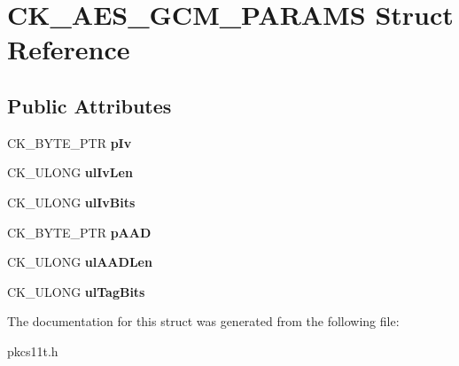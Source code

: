 \hypertarget{struct_c_k___a_e_s___g_c_m___p_a_r_a_m_s}{}\section{C\+K\+\_\+\+A\+E\+S\+\_\+\+G\+C\+M\+\_\+\+P\+A\+R\+A\+MS Struct Reference}
\label{struct_c_k___a_e_s___g_c_m___p_a_r_a_m_s}
\subsection*{Public Attributes}
\begin{DoxyCompactItemize}
\item 
\mbox{\label{struct_c_k___a_e_s___g_c_m___p_a_r_a_m_s_a04e13d2e13d24072950b952936a519a4}} 
C\+K\+\_\+\+B\+Y\+T\+E\+\_\+\+P\+TR {\bfseries p\+Iv}
\item 
\mbox{\label{struct_c_k___a_e_s___g_c_m___p_a_r_a_m_s_ab3637a7619e63914ac571b4736e020d9}} 
C\+K\+\_\+\+U\+L\+O\+NG {\bfseries ul\+Iv\+Len}
\item 
\mbox{\label{struct_c_k___a_e_s___g_c_m___p_a_r_a_m_s_a474b263799ff2d04a6f7c9da548a254d}} 
C\+K\+\_\+\+U\+L\+O\+NG {\bfseries ul\+Iv\+Bits}
\item 
\mbox{\label{struct_c_k___a_e_s___g_c_m___p_a_r_a_m_s_a55da80f688bfd7a24397fdca5196c90e}} 
C\+K\+\_\+\+B\+Y\+T\+E\+\_\+\+P\+TR {\bfseries p\+A\+AD}
\item 
\mbox{\label{struct_c_k___a_e_s___g_c_m___p_a_r_a_m_s_ad1bfc942b8f1f6ce5f1fad10fc4dba60}} 
C\+K\+\_\+\+U\+L\+O\+NG {\bfseries ul\+A\+A\+D\+Len}
\item 
\mbox{\label{struct_c_k___a_e_s___g_c_m___p_a_r_a_m_s_a878314015a72de73c76ff443e420b507}} 
C\+K\+\_\+\+U\+L\+O\+NG {\bfseries ul\+Tag\+Bits}
\end{DoxyCompactItemize}


The documentation for this struct was generated from the following file\+:\begin{DoxyCompactItemize}
\item 
pkcs11t.\+h\end{DoxyCompactItemize}
